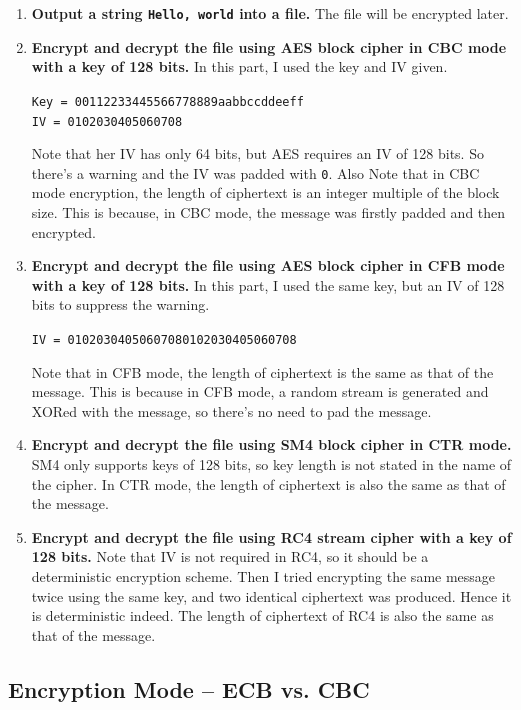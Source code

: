 \begin{enumerate}[label=(\arabic*)]
\item {
    \textbf{Output a string \texttt{Hello, world} into a file.} 
    The file will be encrypted later.
}
\item {
    \textbf{Encrypt and decrypt the file using AES block cipher in CBC mode with a key of 128 bits.} 
    In this part, I used the key and IV given.
    \begin{center}
        \texttt{Key = 00112233445566778889aabbccddeeff} \\
        \texttt{IV  = 0102030405060708}
    \end{center}
    Note that her IV has only 64 bits, but AES requires an IV of 128 bits. So there's a warning and the IV was padded with \texttt{0}. 
    Also Note that in CBC mode encryption, the length of ciphertext is an integer multiple of the block size. This is because, in CBC mode, the message was firstly padded and then encrypted.
}
\item {
    \textbf{Encrypt and decrypt the file using AES block cipher in CFB mode with a key of 128 bits. }
    In this part, I used the same key, but an IV of 128 bits to suppress the warning.
    \begin{center}
        \texttt{IV  = 01020304050607080102030405060708}
    \end{center}
    Note that in CFB mode, the length of ciphertext is the same as that of the message. This is because in CFB mode, a random stream is generated and XORed with the message, so there's no need to pad the message.   
}
\item {
    \textbf{Encrypt and decrypt the file using SM4 block cipher in CTR mode.}
    SM4 only supports keys of 128 bits, so key length is not stated in the name of the cipher.
    In CTR mode, the length of ciphertext is also the same as that of the message.
}
\item {
    \textbf{Encrypt and decrypt the file using RC4 stream cipher with a key of 128 bits.}
    Note that IV is not required in RC4, so it should be a deterministic encryption scheme. Then I tried encrypting the same message twice using the same key, and two identical ciphertext was produced. Hence it is deterministic indeed.
    The length of ciphertext of RC4 is also the same as that of the message.
}
\end{enumerate}

\subsection{Encryption Mode – ECB vs. CBC}

